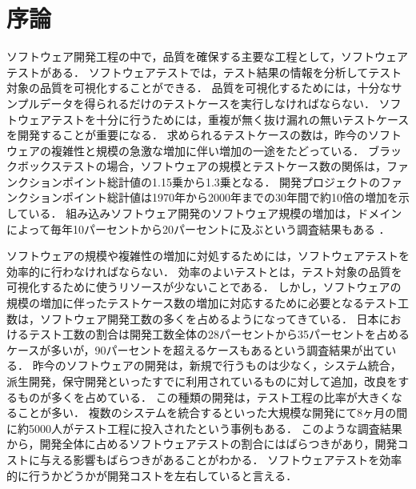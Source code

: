 \chapter{序論}
ソフトウェア開発工程の中で，品質を確保する主要な工程として，ソフトウェアテストがある．
ソフトウェアテストでは，テスト結果の情報を分析してテスト対象の品質を可視化することができる．
品質を可視化するためには，十分なサンプルデータを得られるだけのテストケースを実行しなければならない．
ソフトウェアテストを十分に行うためには，重複が無く抜け漏れの無いテストケースを開発することが重要になる．
求められるテストケースの数は，昨今のソフトウェアの複雑性と規模の急激な増加に伴い増加の一途をたどっている．
ブラックボックステストの場合，ソフトウェアの規模とテストケース数の関係は，ファンクションポイント総計値の1.15乗から1.3乗となる\cite{jones1998estimating}．
開発プロジェクトのファンクションポイント総計値は1970年から2000年までの30年間で約10倍の増加を示している\cite{longstreet2000}．
組み込みソフトウェア開発のソフトウェア規模の増加は，ドメインによって毎年10パーセントから20パーセントに及ぶという調査結果もある \cite{jones2009}．

ソフトウェアの規模や複雑性の増加に対処するためには，ソフトウェアテストを効率的に行わなければならない．
効率のよいテストとは，テスト対象の品質を可視化するために使うリソースが少ないことである．
しかし，ソフトウェアの規模の増加に伴ったテストケース数の増加に対応するために必要となるテスト工数は，ソフトウェア開発工数の多くを占めるようになってきている．
日本におけるテスト工数の割合は開発工数全体の28パーセントから35パーセントを占めるケースが多いが，90パーセントを超えるケースもあるという調査結果が出ている\cite{IPA2015}．
昨今のソフトウェアの開発は，新規で行うものは少なく，システム統合，派生開発，保守開発といったすでに利用されているものに対して追加，改良をするものが多くを占めている．
この種類の開発は，テスト工程の比率が大きくなることが多い．
複数のシステムを統合するといった大規模な開発にて8ヶ月の間に約5000人がテスト工程に投入されたという事例もある\cite{MTBUDay2}．
このような調査結果から，開発全体に占めるソフトウェアテストの割合にはばらつきがあり，開発コストに与える影響もばらつきがあることがわかる．
ソフトウェアテストを効率的に行うかどうかが開発コストを左右していると言える．

